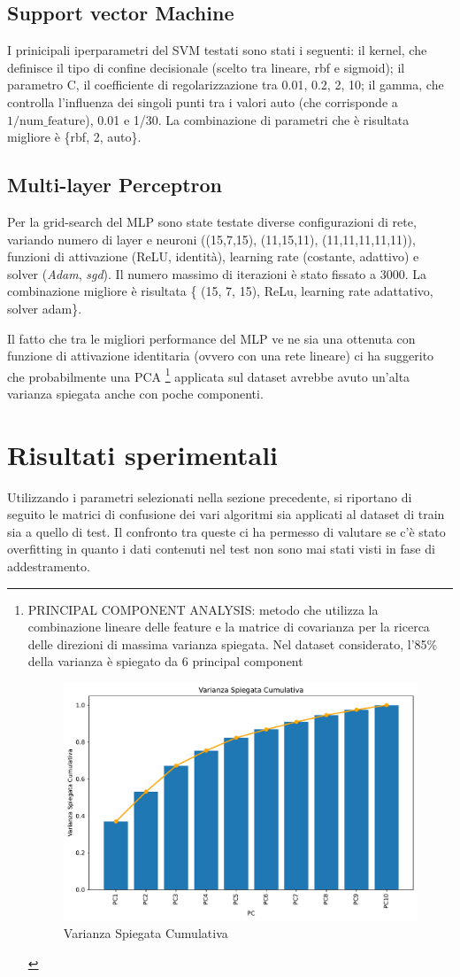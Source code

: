 \documentclass[conference]{IEEEtran}
\begin{document}
\subsection{Support vector Machine}
I prinicipali iperparametri del SVM testati sono stati i seguenti: il kernel, che definisce il tipo di confine decisionale (scelto tra lineare, rbf e sigmoid); il parametro C, il coefficiente di regolarizzazione tra 0.01, 0.2, 2, 10; il gamma, che controlla l’influenza dei singoli punti tra i valori auto (che corrisponde a $1 / \text{num\_feature}$), 0.01 e 1/30. La combinazione di parametri che è risultata migliore è \{rbf, 2, auto\}.

\subsection{Multi-layer Perceptron}
Per la grid-search del MLP sono state testate diverse configurazioni di rete, variando numero di layer e neuroni ((15,7,15), (11,15,11), (11,11,11,11,11)), funzioni di attivazione (ReLU, identità), learning rate (costante, adattivo) e solver (\textit{Adam}, \textit{sgd}). Il numero massimo di iterazioni è stato fissato a 3000.
La combinazione migliore è risultata \{ (15, 7, 15), ReLu, learning rate adattativo, solver adam\}.

Il fatto che tra le migliori performance del MLP ve ne sia una ottenuta con funzione di attivazione identitaria (ovvero con una rete lineare) ci ha suggerito che probabilmente una PCA \footnote{PRINCIPAL COMPONENT ANALYSIS: metodo che utilizza la combinazione lineare delle feature e la matrice di covarianza per la ricerca delle direzioni di massima varianza spiegata. Nel dataset considerato, l'85\% della varianza è spiegato da 6 principal component
\begin{figure} [H]
    \centering
    \includegraphics[width=0.3\linewidth]{varianzaSpiegataCumulativa.pdf}
    \caption{\footnotesize Varianza Spiegata Cumulativa }
    \label{varianzaSpiegataCumulativa}
\end{figure}}
applicata sul dataset avrebbe avuto un'alta varianza spiegata anche con poche componenti.


\section{Risultati sperimentali}
Utilizzando i parametri selezionati nella sezione precedente, si riportano di seguito le matrici di confusione dei vari algoritmi sia applicati al dataset di train sia a quello di test. Il confronto tra queste ci ha permesso di valutare se c'è stato overfitting in quanto i dati contenuti nel test non sono mai stati visti in fase di addestramento. 
\end{document}
